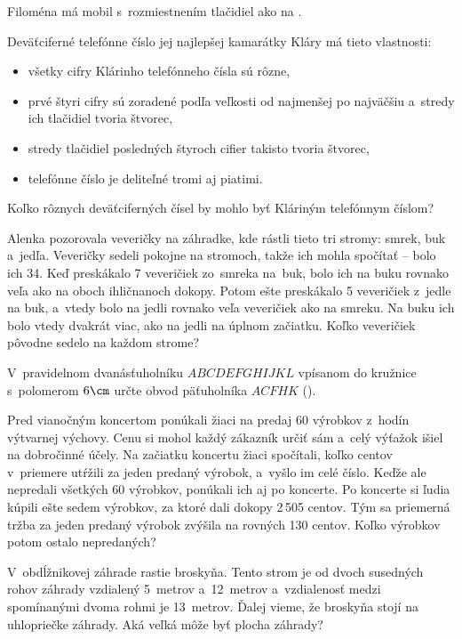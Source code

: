 {%
Filoména má mobil s~rozmiestnením tlačidiel ako na \obr.
%

Deväťciferné telefónne číslo jej najlepšej kamarátky Kláry má tieto
vlastnosti:
\begin{itemize}
  \item všetky cifry Klárinho telefónneho čísla sú rôzne,
  \item prvé štyri cifry sú zoradené podľa veľkosti od najmenšej po najväčšiu a~stredy ich tlačidiel tvoria štvorec,
  \item stredy tlačidiel posledných štyroch cifier takisto tvoria štvorec,
  \item telefónne číslo je deliteľné tromi aj piatimi.
\end{itemize}
Koľko rôznych deväťciferných čísel by mohlo byť Kláriným telefónnym číslom?}

{%
Alenka pozorovala veveričky na záhradke, kde rástli tieto tri stromy:
smrek, buk a~jedľa.
Veveričky sedeli pokojne na stromoch, takže ich mohla spočítať -- bolo ich
34.
Keď preskákalo 7 veveričiek zo~smreka na~buk, bolo ich na buku rovnako veľa ako na oboch ihličnanoch dokopy. Potom ešte preskákalo 5 veveričiek z~jedle na buk, a~vtedy bolo na jedli rovnako veľa veveričiek ako na smreku. Na buku ich bolo vtedy dvakrát viac, ako na jedli na úplnom začiatku. Koľko veveričiek pôvodne sedelo na každom strome?}

{%
V~pravidelnom dvanásťuholníku $ABCDEFGHIJKL$ vpísanom do kružnice
s~polomerom $6\cm$ určte obvod päťuholníka $ACFHK$ (\obr).
%
}

{%
Pred vianočným koncertom ponúkali žiaci na predaj 60 výrobkov z~hodín výtvarnej
výchovy. Cenu si mohol každý zákazník určiť sám a~celý výťažok išiel na
dobročinné účely. Na začiatku koncertu žiaci spočítali, koľko centov v~priemere
utŕžili za jeden predaný výrobok, a~vyšlo im celé číslo. Keďže
ale nepredali všetkých 60 výrobkov, ponúkali ich aj po koncerte. Po koncerte si ľudia kúpili ešte sedem výrobkov, za ktoré dali dokopy 2\,505 centov. Tým sa priemerná
tržba za jeden predaný výrobok zvýšila na rovných 130 centov. Koľko výrobkov potom ostalo nepredaných?}

{%
V~obdĺžnikovej záhrade rastie broskyňa. Tento strom je od dvoch susedných rohov
záhrady vzdialený 5~metrov a~12~metrov a~vzdialenosť medzi spomínanými dvoma rohmi je
13~metrov. Ďalej vieme, že broskyňa stojí na uhlopriečke záhrady.
Aká veľká môže byť plocha záhrady?}

